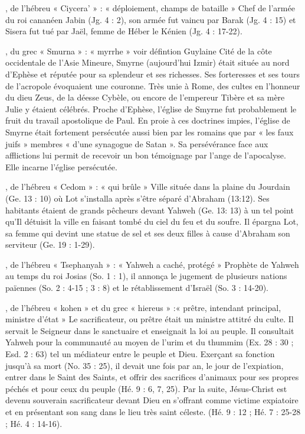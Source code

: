 \begin{multicols}{2}
, de l'hébreu « Ciycera' » : « déploiement, champs de bataille »
Chef de l'armée du roi cananéen Jabin (Jg. 4 : 2), son armée fut vaincu par Barak (Jg. 4 : 15) et Sisera fut tué par Jaël, femme de Héber le Kénien (Jg. 4 : 17-22).


, du grec « Smurna » : « myrrhe » voir défintion Guylaine
Cité de la côte occidentale de l’Asie Mineure, Smyrne (aujourd’hui Izmir) était située au nord d’Ephèse et réputée pour sa splendeur et ses richesses. Ses forteresses et ses tours de l’acropole évoquaient une couronne. Très unie à Rome, des cultes en l’honneur du dieu Zeus, de la déesse Cybèle, ou encore de l’empereur Tibère et sa mère Julie y étaient célébrés.
Proche d’Ephèse, l’église de Smyrne fut probablement le fruit du travail apostolique de Paul. En proie à ces doctrines impies, l’église de Smyrne était fortement persécutée aussi bien par les romains que par « les faux juifs » membres « d’une synagogue de Satan ». Sa persévérance face aux afflictions lui permit de recevoir un bon témoignage par l’ange de l’apocalyse. Elle incarne l’église persécutée.


, de l'hébreu « Cedom » : « qui brûle »
Ville située dans la plaine du Jourdain (Ge. 13 : 10) où Lot s'installa après s'être séparé d'Abraham (13:12). Ses habitants étaient de grands pêcheurs devant Yahweh (Ge. 13: 13) à un tel point qu'Il détuisit la ville en faisant tombé du ciel du feu et du soufre. Il épargna Lot, sa femme qui devint une statue de sel et ses deux filles à cause d'Abraham son serviteur (Ge. 19 : 1-29).


, de l'hébreu « Tsephanyah » : « Yahweh a caché, protégé »
Prophète de Yahweh au temps du roi Josias (So. 1 : 1), il annonça le jugement de plusieurs nations païennes (So. 2 : 4-15 ; 3 : 8) et le rétablissement d'Israël (So. 3 : 14-20).


, de l'hébreu « kohen » et du grec « hiereus » :« prêtre, intendant principal, ministre d'état »
Le sacrificateur, ou prêtre était un ministre attitré du culte. Il servait le Seigneur dans le sanctuaire et enseignait la loi au peuple. Il consultait Yahweh pour la communauté au moyen de l'urim et du thummim (Ex. 28 : 30 ; Esd. 2 : 63) tel un médiateur entre le peuple et Dieu. Exerçant sa fonction jusqu'à sa mort (No. 35 : 25), il devait une fois par an, le jour de l'expiation, entrer dans le Saint des Saints, et offrir des sacrifices d'animaux pour ses propres péchés et pour ceux du peuple (Hé. 9 : 6, 7, 25). Par la suite, Jésus-Christ est devenu souverain sacrificateur devant Dieu en s'offrant comme victime expiatoire et en présentant son sang dans le lieu très saint céleste. (Hé. 9 : 12 ; Hé. 7 : 25-28 ; Hé. 4 : 14-16).



\end{multicols}
